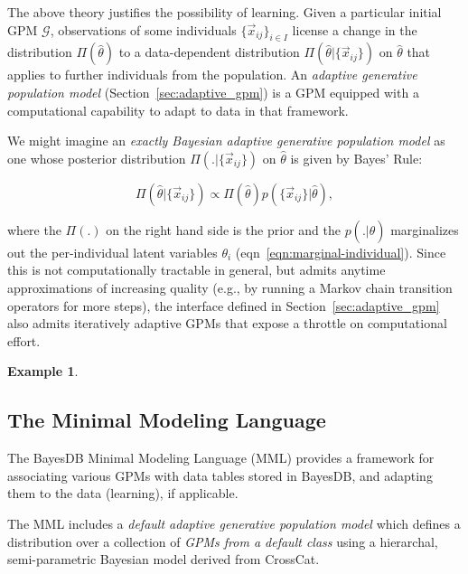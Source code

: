 \documentclass[10pt,letterpaper]{article}
\newtheorem{example}{Example}[section]
\newcommand{\G}{\mathcal{G}}
\begin{document}
The above theory justifies the possibility of learning.  Given a
particular initial GPM $\G$, observations of some individuals
$\{\vec{x}_{ij}\}_{i \in I}$ license a change in the distribution
$\Pi(\hat\theta)$ to a data-dependent distribution
$\Pi(\hat\theta|\{\vec{x}_{ij}\})$ on $\hat\theta$ that applies to
further individuals from the population.  An \emph{adaptive generative
  population model} (Section~\ref{sec:adaptive_gpm}) is a GPM equipped
with a computational capability to adapt to data in that framework.

We might imagine an \emph{exactly Bayesian adaptive generative population model}
as one whose posterior distribution $\Pi(.|\{\vec{x}_{ij}\})$ on
$\hat\theta$ is given by Bayes' Rule:

\[ \Pi(\hat\theta|\{\vec{x}_{ij}\}) \propto \Pi(\hat\theta) p(\{\vec{x}_{ij}\}|\hat\theta), \]

where the $\Pi(.)$ on the right hand side is the prior and the $p(.|\hat\theta)$
marginalizes out the per-individual latent variables $\theta_i$ (eqn~\ref{eqn:marginal-individual}).
Since this is not computationally tractable in general, but admits
anytime approximations of increasing quality (e.g., by running a Markov chain
transition operators for more steps), the
interface defined in Section~\ref{sec:adaptive_gpm} also admits
iteratively adaptive GPMs that expose a throttle on computational
effort.

\begin{example}
\end{example}

\subsection{The Minimal Modeling Language}
\label{sec:mml}

The BayesDB Minimal Modeling Language (MML) provides a framework for
associating various GPMs with data tables stored in BayesDB, and
adapting them to the data (learning), if applicable.

The MML includes a \textit{default adaptive generative population
  model} which defines a distribution over a collection of
\textit{GPMs from a default class} using a hierarchal, semi-parametric
Bayesian model derived from CrossCat.
\end{document}
